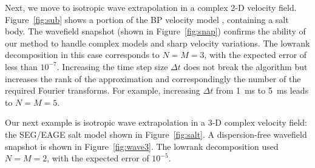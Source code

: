 


Next, we move to isotropic wave extrapolation in a complex 2-D velocity
field. Figure~\ref{fig:sub} shows a portion of the BP velocity model
\cite[]{bp}, containing a salt body. The wavefield snapshot (shown in
Figure~\ref{fig:snap}) confirms the ability of our method to handle
complex models and sharp velocity variations. The lowrank
decomposition in this case corresponds to $N=M=3$, with the expected
error of less than $10^{-7}$. Increasing the time step size $\Delta t$
does not break the algorithm but increases the rank of the
approximation and correspondingly the number of the required Fourier
transforms. For example, increasing $\Delta t$ from 1~ms to 5~ms leads
to $N=M=5$.



Our next example is isotropic wave extrapolation in a 3-D complex
velocity field: the SEG/EAGE salt model \cite[]{seg-eage} shown in
Figure~\ref{fig:salt}. A dispersion-free wavefield snapshot is shown
in Figure~\ref{fig:wave3}. The lowrank decomposition used $N=M=2$, with
the expected error of $10^{-5}$.




